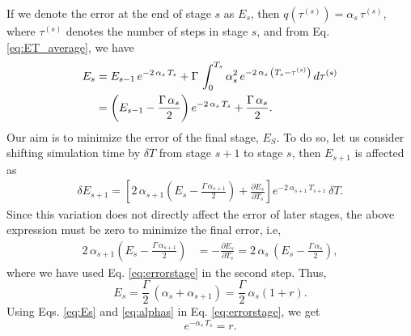\documentclass[reprint, superscriptaddress, floatfix]{revtex4-1}
\begin{document}
If we denote the error at the end of stage $s$ as $E_s$,
then $q\left( \tau^{(s)} \right) = \alpha_s \, \tau^{(s)}$,
where $\tau^{(s)}$ denotes the number of steps in stage $s$,
and from Eq. \eqref{eq:ET_average}, we have
%
\begin{align}
  E_s
  &=
  E_{s - 1} \, e^{-2 \, \alpha_s \, T_s }
  +
  \Gamma \, \int_0^{T_s}
  \alpha_s^2 \,
  e^{ -2 \, \alpha_s \, \left(T_s - \tau^{(s)}\right) }
  \, d \tau^{(s)}
  \notag
  \\
  &=
  \left(
    E_{s - 1} - \frac{ \Gamma \, \alpha_s } { 2 }
  \right)
  e^{ - 2 \, \alpha_s \, T_s }
  +
  \frac{ \Gamma \, \alpha_s } { 2 }
  .
  \label{eq:errorstage}
\end{align}
%
Our aim is to minimize the error
of the final stage, $E_S$.
%
To do so, let us consider shifting simulation time
by $\delta T$ from
stage $s+1$ to stage $s$,
then $E_{s+1}$ is affected as
%
\begin{align*}
  \delta E_{s+1}
  =
\left[
  2 \, \alpha_{s+1}
  \left(
    E_s - \tfrac{ \Gamma \, \alpha_{s+1} } { 2 }
  \right)
  +
  \frac{ \partial E_s } { \partial T_s }
\right]
e^{-2 \, \alpha_{s+1} \, T_{s+1} }
\,
\delta T
.
\end{align*}
%
Since this variation does not directly affect the error of later stages,
the above expression must be zero to minimize the final error, i.e,
%
\begin{align*}
  2 \, \alpha_{s+1}
  \left(
    E_s - \frac{ \Gamma \, \alpha_{s+1} } { 2 }
  \right)
  &=
  -\frac{ \partial E_s } { \partial T_s }
  =
  2 \, \alpha_s \, \left(E_s - \frac{ \Gamma \, \alpha_s } { 2 }  \right)
  ,
\end{align*}
%
where we have used Eq. \eqref{eq:errorstage}
in the second step.
%
Thus,
\begin{equation}
  E_s
  =
  \frac{ \Gamma } { 2 } \, ( \alpha_s + \alpha_{s+1} )
  =
  \frac{ \Gamma } { 2 } \, \alpha_s ( 1 + r )
  .
  \label{eq:Es}
\end{equation}
%
Using Eqs. \eqref{eq:Es} and \eqref{eq:alphas}
in Eq. \eqref{eq:errorstage}, we get
%
\begin{equation}
  e^{-\alpha_s \, T_s } = r
  .
  \label{eq:exp_r}
\end{equation}
%
\end{document}
